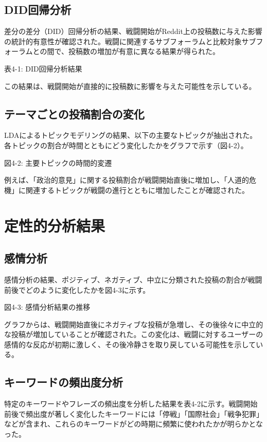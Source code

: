 \documentclass[11pt, a4j]{jreport}
\begin{document}
    \subsection{DID回帰分析}
    差分の差分（DID）回帰分析の結果、戦闘開始がReddit上の投稿数に与えた影響の統計的有意性が確認された。戦闘に関連するサブフォーラムと比較対象サブフォーラムとの間で、投稿数の増加が有意に異なる結果が得られた。

    表4-1: DID回帰分析結果

    この結果は、戦闘開始が直接的に投稿数に影響を与えた可能性を示している。

    \subsection{テーマごとの投稿割合の変化}
    LDAによるトピックモデリングの結果、以下の主要なトピックが抽出された。各トピックの割合が時間とともにどう変化したかをグラフで示す（図4-2）。

    図4-2: 主要トピックの時間的変遷

    例えば、「政治的意見」に関する投稿割合が戦闘開始直後に増加し、「人道的危機」に関連するトピックが戦闘の進行とともに増加したことが確認された。

    \section{定性的分析結果}
    \subsection{感情分析}
    感情分析の結果、ポジティブ、ネガティブ、中立に分類された投稿の割合が戦闘前後でどのように変化したかを図4-3に示す。

    図4-3: 感情分析結果の推移

    グラフからは、戦闘開始直後にネガティブな投稿が急増し、その後徐々に中立的な投稿が増加していることが確認された。この変化は、戦闘に対するユーザーの感情的な反応が初期に激しく、その後冷静さを取り戻している可能性を示している。

    \subsection{キーワードの頻出度分析}
    特定のキーワードやフレーズの頻出度を分析した結果を表4-2に示す。戦闘開始前後で頻出度が著しく変化したキーワードには「停戦」「国際社会」「戦争犯罪」などが含まれ、これらのキーワードがどの時期に頻繁に使われたかが明らかとなった。
\end{document}
